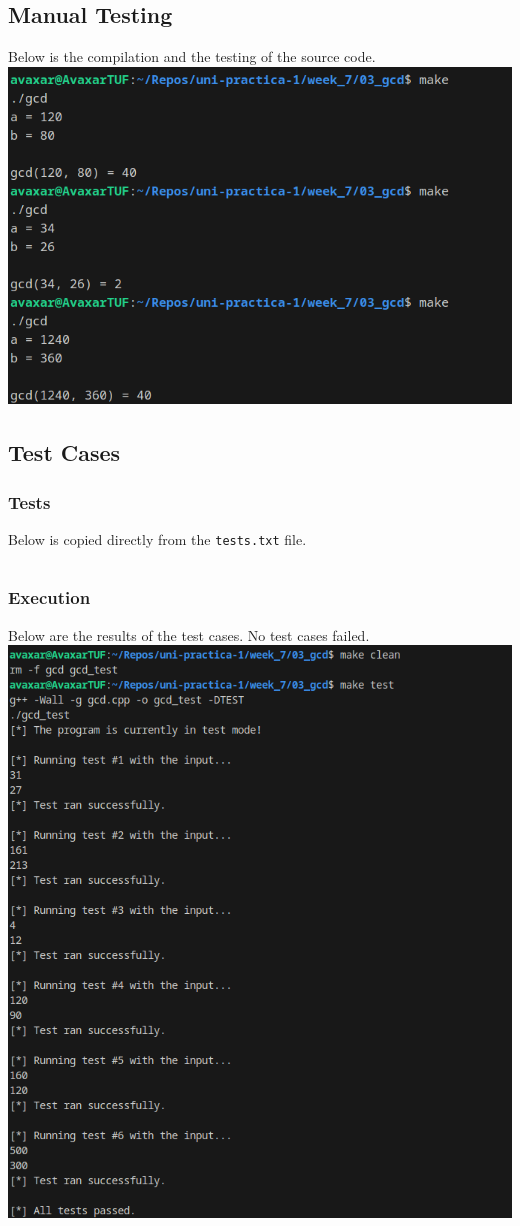 \documentclass[12pt]{article}
\begin{document}
\subsection{Manual Testing}
Below is the compilation and the testing of the source code.
\newline\includegraphics[width=\textwidth]{03_gcd}

\subsection{Test Cases}

\subsubsection{Tests}
Below is copied directly from the \texttt{tests.txt} file.
\inputminted{text}{03_gcd/tests.txt}

\subsubsection{Execution}
Below are the results of the test cases. No test cases failed.
\newline\includegraphics[width=\textwidth]{03_gcd_test}
\end{document}

